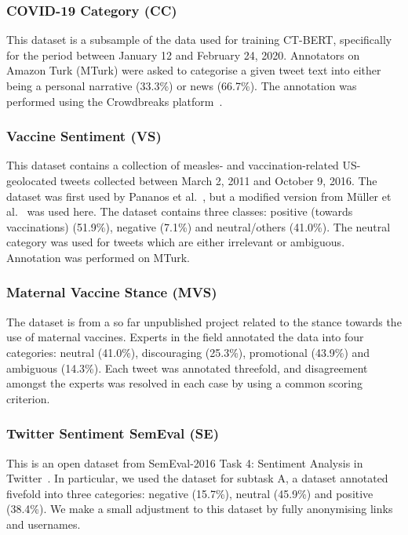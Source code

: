\documentclass{article}
\begin{document}
\begin{multicols}{2}
\subsubsection{COVID-19 Category (CC)}
This dataset is a subsample of the data used for training \textsc{CT-BERT}, specifically for the period between January 12 and February 24, 2020.
Annotators on Amazon Turk (MTurk) were asked to categorise a given tweet text into either being a personal narrative (33.3\%) or news (66.7\%).
The annotation was performed using the Crowdbreaks platform~\cite{muller2019crowdbreaks}.

\subsubsection{Vaccine Sentiment (VS)}
This dataset contains a collection of measles- and vaccination-related US-geolocated tweets collected between March 2, 2011 and October 9, 2016.
The dataset was first used by Pananos et al.~\cite{pananos2017critical}, but a modified version from M\"uller et al.~\cite{muller2019crowdbreaks} was used here.
The dataset contains three classes: positive (towards vaccinations) (51.9\%), negative (7.1\%) and neutral/others (41.0\%).
The neutral category was used for tweets which are either irrelevant or ambiguous. Annotation was performed on MTurk.

\subsubsection{Maternal Vaccine Stance (MVS)}
The dataset is from a so far unpublished project related to the stance towards the use of maternal vaccines.
Experts in the field annotated the data into four categories: neutral (41.0\%), discouraging (25.3\%), promotional (43.9\%) and ambiguous (14.3\%).
Each tweet was annotated threefold, and disagreement amongst the experts was resolved in each case by using a common scoring criterion.

\subsubsection{Twitter Sentiment SemEval (SE)}
This is an open dataset from SemEval-2016 Task 4: Sentiment Analysis in Twitter~\cite{nakov2019semeval}.
In particular, we used the dataset for subtask A, a dataset annotated fivefold into three categories: negative (15.7\%), neutral (45.9\%) and positive (38.4\%).
We make a small adjustment to this dataset by fully anonymising links and usernames.


\end{multicols}
\end{document}
